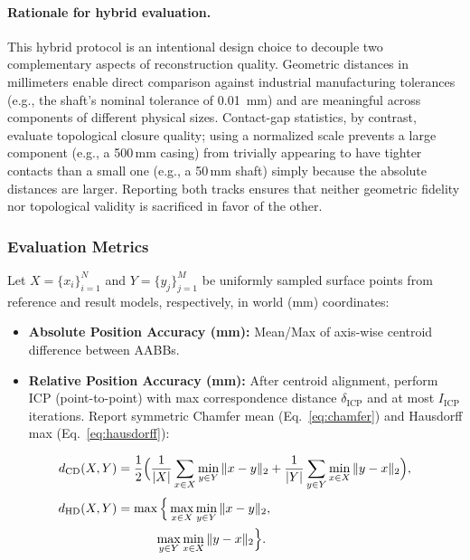\documentclass{ieeeaccess}
\begin{document}
\paragraph*{Rationale for hybrid evaluation.}
\label{sec:hybrid_eval_rationale}
This hybrid protocol is an intentional design choice to decouple
two complementary aspects of reconstruction quality.
Geometric distances in millimeters enable direct comparison
against industrial manufacturing tolerances (e.g., the shaft's
nominal tolerance of \SI{0.01}{\milli\meter}) and are meaningful
across components of different physical sizes.
Contact-gap statistics, by contrast, evaluate topological closure
quality; using a normalized scale prevents a large component
(e.g., a 500\,mm casing) from trivially appearing to have
tighter contacts than a small one (e.g., a 50\,mm shaft) simply
because the absolute distances are larger.
Reporting both tracks ensures that neither geometric fidelity
nor topological validity is sacrificed in favor of the other.

\subsubsection{Evaluation Metrics}
Let \(X=\{x_i\}_{i=1}^{N}\) and \(Y=\{y_j\}_{j=1}^{M}\) be uniformly sampled surface points from reference and result models, respectively, in world (mm) coordinates:
\begin{itemize}
  \item \textbf{Absolute Position Accuracy (mm):} Mean/Max of axis-wise centroid difference between AABBs.
  \item \textbf{Relative Position Accuracy (mm):} After centroid alignment, perform ICP (point-to-point) with max correspondence distance \(\delta_{\mathrm{ICP}}\) and at most \(I_{\mathrm{ICP}}\) iterations. Report symmetric Chamfer mean (Eq.~\eqref{eq:chamfer}) and Hausdorff max (Eq.~\eqref{eq:hausdorff}):
\end{itemize}

\begin{align}
d_{\mathrm{CD}}(X,Y)
  &= \frac{1}{2}\Bigl(
      \frac{1}{|X|}\sum_{x\in X}\min_{y\in Y}\|x-y\|_2
      + \frac{1}{|Y|}\sum_{y\in Y}\min_{x\in X}\|y-x\|_2
     \Bigr),
  \label{eq:chamfer}
\\[2pt]
d_{\mathrm{HD}}(X,Y)
  &= \max\Big\{
        \max_{x\in X}\min_{y\in Y}\|x-y\|_2, \notag\\
  &\qquad\quad
        \max_{y\in Y}\min_{x\in X}\|y-x\|_2
     \Big\}.
  \label{eq:hausdorff}
\end{align}
\end{document}
